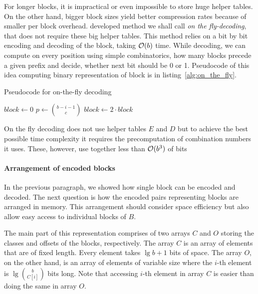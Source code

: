 For longer blocks, it is impractical or even impossible to store huge helper tables. On the other
hand, bigger block sizes yield better compression rates because of smaller per block overhead. \cite{navarro2012fast}
developed method we shall call \textit{on the fly-decoding}, that does not require these big helper tables. 
This method relies on a bit by bit encoding and decoding of the block, taking $\mathcal{O}(b)$ time. While decoding,
we can compute on every position using simple combinatorics, how many blocks precede a given prefix and decide,
whether next bit should be 0 or 1. Pseudocode of this idea computing binary representation of block is in
listing~\ref{alg:on_the_fly}.

\begin{algorithm}
\caption{Pseudocode for on-the-fly decoding}\label{alg:on_the_fly}
    $block \gets 0$\;
     {
        $p \gets {b-i-1\choose c}$\;
         {
            $block \gets 2\cdot block$\;
        } 
    }
\end{algorithm}

On the fly decoding does not use helper tables $E$ and $D$ but to achieve the best possible time complexity
it requires the precomputation of combination numbers it uses. These, however, use together less than $\mathcal{O}(b^3)$
of bits

\paragraph{Arrangement of encoded blocks}

In the previous paragraph, we showed how single block can be encoded and decoded. The next question is how the
encoded pairs representing blocks are arranged in memory. This arrangement should consider space efficiency
but also allow easy access to individual blocks of $B$. 

The main part of this representation comprises of two arrays $C$ and $O$ storing the classes and offsets of
the blocks, respectively. The array $C$ is an array of elements that are of fixed length. Every element takes
$\lg b+1$ bits of space. The array $O$, on the other hand, is an array of elements of variable
size where the $i$-th element is $\lg {b\choose C[i]}$ bits long. Note that accessing $i$-th element
in array $C$ is easier than doing the same in array $O$.

